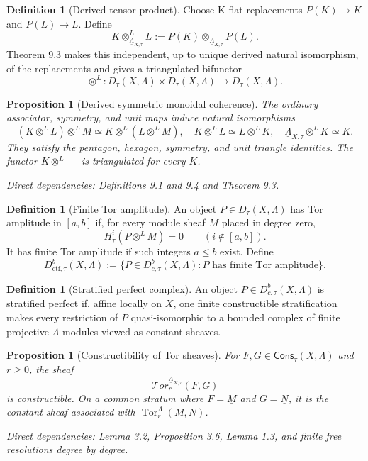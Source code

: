 \documentclass[10pt]{article}
\newtheorem{proposition}[theorem]{Proposition}
\theoremstyle{definition}
\newtheorem{definition}[theorem]{Definition}
\newcommand{\Lam}{\Lambda}
\newcommand{\Cons}{\mathsf{Cons}}
\newcommand{\DbcAt}[1]{D^b_{c,#1}}
\newcommand{\DctfAt}[1]{D^b_{\mathrm{ctf},#1}}
\newcommand{\Tor}{\operatorname{Tor}}
\newcommand{\dep}[1]{\par\smallskip\noindent\textit{Direct dependencies: #1}}
\begin{document}
\begin{definition}[Derived tensor product]
Choose K-flat replacements $P(K)\to K$ and $P(L)\to L$.  Define
\[
K\otimes^L_{\underline\Lam_{X,\tau}}L
:=P(K)\otimes_{\underline\Lam_{X,\tau}}P(L).
\]
Theorem 9.3 makes this independent, up to unique derived natural isomorphism,
of the replacements and gives a triangulated bifunctor
\[
\otimes^L:D_\tau(X,\Lam)\times D_\tau(X,\Lam)
\longrightarrow D_\tau(X,\Lam).
\]
\end{definition}

\begin{proposition}[Derived symmetric monoidal coherence]
The ordinary associator, symmetry, and unit maps induce natural isomorphisms
\[
(K\otimes^LL)\otimes^LM\simeq K\otimes^L(L\otimes^LM),
\quad K\otimes^LL\simeq L\otimes^LK,
\quad \underline\Lam_{X,\tau}\otimes^LK\simeq K.
\]
They satisfy the pentagon, hexagon, symmetry, and unit triangle identities.
The functor $K\otimes^L-$ is triangulated for every $K$.
\dep{Definitions 9.1 and 9.4 and Theorem 9.3.}
\end{proposition}

\begin{definition}[Finite Tor amplitude]
An object $P\in D_\tau(X,\Lam)$ has Tor amplitude in $[a,b]$ if, for every
module sheaf $M$ placed in degree zero,
\[
H^i_\tau(P\otimes^L M)=0\qquad(i\notin[a,b]).
\]
It has finite Tor amplitude if such integers $a\le b$ exist.  Define
\[
\DctfAt{\tau}(X,\Lam)
:=\{P\in\DbcAt{\tau}(X,\Lam):P\text{ has finite Tor amplitude}\}.
\]
\end{definition}

\begin{definition}[Stratified perfect complex]
An object $P\in\DbcAt{\tau}(X,\Lam)$ is stratified perfect if, affine locally on
$X$, one finite constructible stratification makes every restriction of $P$
quasi-isomorphic to a bounded complex of finite projective $\Lam$-modules
viewed as constant sheaves.
\end{definition}

\begin{proposition}[Constructibility of Tor sheaves]
For $F,G\in\Cons_\tau(X,\Lam)$ and $r\ge0$, the sheaf
\[
\mathcal T\!or_r^{\underline\Lam_{X,\tau}}(F,G)
\]
is constructible.  On a common stratum where $F=\underline M$ and
$G=\underline N$, it is the constant sheaf associated with
$\Tor_r^\Lam(M,N)$.
\dep{Lemma 3.2, Proposition 3.6, Lemma 1.3, and finite free resolutions degree
by degree.}
\end{proposition}
\end{document}
